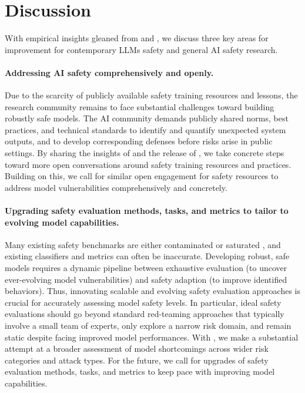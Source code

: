 \section{Discussion}
\label{sec:discussion_limitation_future}

With empirical insights gleaned from \method and \dataset, we discuss three key areas for improvement for contemporary LLMs safety and general AI safety research. 

\paragraph{Addressing AI safety comprehensively and openly.}
Due to the scarcity of publicly available safety training resources and lessons, the research community remains to face substantial challenges toward building robustly safe models. The AI community demands publicly shared norms, best practices, and technical standards to identify and quantify unexpected system outputs, and to develop corresponding defenses before risks arise in public settings. By sharing the insights of \method and the release of \dataset, we take concrete steps toward more open conversations around safety training resources and practices. Building on this, we call for similar open engagement for safety resources to address model vulnerabilities comprehensively and concretely.


\paragraph{Upgrading safety evaluation methods, tasks, and metrics to tailor to evolving model capabilities.}
Many existing safety benchmarks are either contaminated \citep{golchin2023time} or saturated \citep{zheng2023lmsyschat1m}, and existing classifiers and metrics can often be inaccurate. Developing robust, safe models requires a dynamic pipeline between exhaustive evaluation (to uncover ever-evolving model vulnerabilities) and safety adaption (to improve identified behaviors). Thus, innovating scalable and evolving safety evaluation approaches is crucial for accurately assessing model safety levels. In particular, ideal safety evaluations should go beyond standard red-teaming approaches that typically involve a small team of experts, only explore a narrow risk domain, and remain static despite facing improved model performances. With \method, we make a substantial attempt at a broader assessment of model shortcomings across wider risk categories and attack types. For the future, we call for upgrades of safety evaluation methods, tasks, and metrics to keep pace with improving model capabilities.


